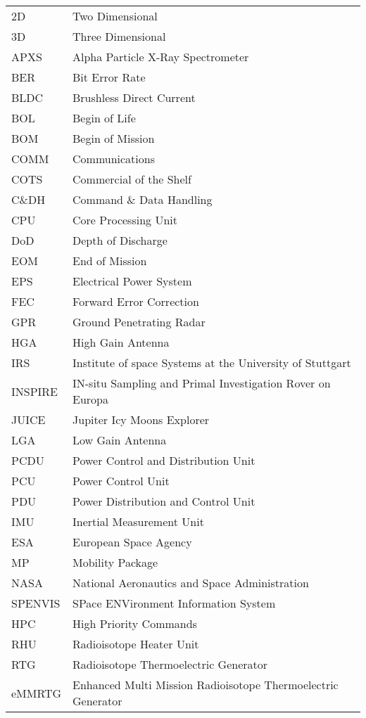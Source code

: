 \begin{longtable}[l]{ll}

2D		& Two Dimensional \\
3D		& Three Dimensional \\
APXS	& Alpha Particle X-Ray Spectrometer \\
BER		& Bit Error Rate \\
BLDC	& Brushless Direct Current	\\
BOL     & Begin of Life \\
BOM     & Begin of Mission \\
COMM    & Communications \\
COTS	& Commercial of the Shelf \\
C\&DH	& Command \& Data Handling \\
CPU		& Core Processing Unit \\
DoD     & Depth of Discharge \\
EOM     & End of Mission \\
EPS     & Electrical Power System \\
FEC		& Forward Error Correction \\
GPR		& Ground Penetrating Radar \\
HGA	    & High Gain Antenna \\
IRS     & Institute of space Systems at the University of Stuttgart \\
INSPIRE & IN-situ Sampling and Primal Investigation Rover on Europa \\
JUICE 	& Jupiter Icy Moons Explorer \\
LGA		& Low Gain Antenna \\		
PCDU    & Power Control and Distribution Unit \\
PCU     & Power Control Unit \\
PDU     & Power Distribution and Control Unit \\
IMU     & Inertial Measurement Unit \\
ESA		& European Space Agency	\\
MP		& Mobility Package \\
NASA    &   National Aeronautics and Space Administration \\
SPENVIS	&	SPace ENVironment Information System	\\
HPC     & High Priority Commands \\
RHU		& Radioisotope Heater Unit\\
RTG     & Radioisotope Thermoelectric Generator \\
eMMRTG  & Enhanced Multi Mission Radioisotope Thermoelectric Generator \\

\end{longtable}
